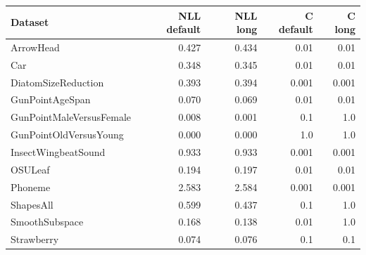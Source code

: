 \begin{tabular}{lrrrr}
\toprule
Dataset & NLL default & NLL long & C default & C long \\
\midrule
ArrowHead & 0.427 & 0.434 & 0.01 & 0.01 \\
Car & 0.348 & 0.345 & 0.01 & 0.01 \\
DiatomSizeReduction & 0.393 & 0.394 & 0.001 & 0.001 \\
GunPointAgeSpan & 0.070 & 0.069 & 0.01 & 0.01 \\
GunPointMaleVersusFemale & 0.008 & 0.001 & 0.1 & 1.0 \\
GunPointOldVersusYoung & 0.000 & 0.000 & 1.0 & 1.0 \\
InsectWingbeatSound & 0.933 & 0.933 & 0.001 & 0.001 \\
OSULeaf & 0.194 & 0.197 & 0.01 & 0.01 \\
Phoneme & 2.583 & 2.584 & 0.001 & 0.001 \\
ShapesAll & 0.599 & 0.437 & 0.1 & 1.0 \\
SmoothSubspace & 0.168 & 0.138 & 0.01 & 1.0 \\
Strawberry & 0.074 & 0.076 & 0.1 & 0.1 \\
\bottomrule
\end{tabular}
